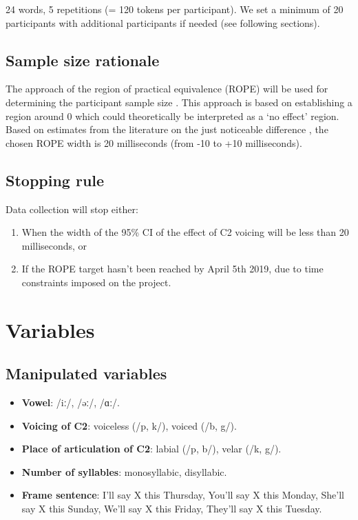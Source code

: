 \documentclass[11pt,]{article}
\providecommand{\tightlist}{%
  \setlength{\itemsep}{0pt}\setlength{\parskip}{0pt}}
\begin{document}
24 words, 5 repetitions (= 120 tokens per participant). We set a minimum
of 20 participants with additional participants if needed (see following
sections).

\subsection{Sample size rationale}\label{sample-size-rationale}

The approach of the region of practical equivalence (ROPE) will be used
for determining the participant sample size
\citep{kruschke2015, vasishth2018a}. This approach is based on
establishing a region around 0 which could theoretically be interpreted
as a `no effect' region. Based on estimates from the literature on the
just noticeable difference \citep{huggins1972, nooteboom1980}, the
chosen ROPE width is 20 milliseconds (from -10 to +10 milliseconds).

\subsection{Stopping rule}\label{stopping-rule}

Data collection will stop either:

\begin{enumerate}
\def\labelenumi{(\alph{enumi})}
\tightlist
\item
  When the width of the 95\% CI of the effect of C2 voicing will be less
  than 20 milliseconds, or
\item
  If the ROPE target hasn't been reached by April 5th 2019, due to time
  constraints imposed on the project.
\end{enumerate}

\section{Variables}\label{variables}

\subsection{Manipulated variables}\label{manipulated-variables}

\label{s:manipulated}

\begin{itemize}
\tightlist
\item
  \textbf{Vowel}: /iː/, /əː/, /ɑː/.
\item
  \textbf{Voicing of C2}: voiceless (/p, k/), voiced (/b, g/).
\item
  \textbf{Place of articulation of C2}: labial (/p, b/), velar (/k, g/).
\item
  \textbf{Number of syllables}: monosyllabic, disyllabic.
\item
  \textbf{Frame sentence}: I'll say X this Thursday, You'll say X this
  Monday, She'll say X this Sunday, We'll say X this Friday, They'll say
  X this Tuesday.
\end{itemize}
\end{document}
